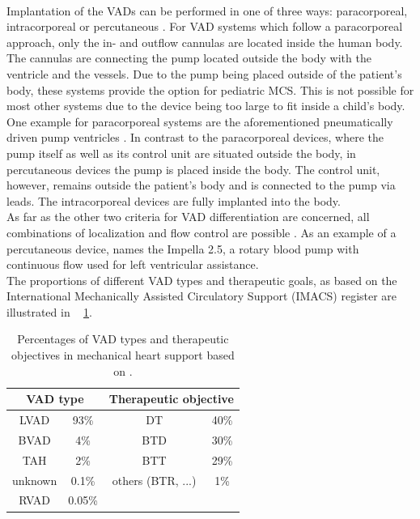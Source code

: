 \\Implantation of the VADs can be performed in one of three ways: paracorporeal, intracorporeal or percutaneous \cite{VAD7}. For VAD systems which follow a paracorporeal approach, only the in- and outflow cannulas are located inside the human body. The cannulas are connecting the pump located outside the body with the ventricle and the vessels. Due to the pump being placed outside of the patient's body, these systems provide the option for pediatric MCS. This is not possible for most other systems due to the device being too large to fit inside a child's body. \cite{VAD10} One example for paracorporeal systems are the aforementioned pneumatically driven pump ventricles \cite{VAD1}. In contrast to the paracorporeal devices, where the pump itself as well as its control unit are situated outside the body, in percutaneous devices the pump is placed inside the body. The control unit, however, remains outside the patient's body and is connected to the pump via leads. The intracorporeal devices are fully implanted into the body. \cite{VAD10}
\\As far as the other two criteria for VAD differentiation are concerned, all combinations of localization and flow control are possible \cite{VAD10}. As an example of a percutaneous device, \cite{VAD7} names the Impella 2.5, a rotary blood pump with continuous flow used for left ventricular assistance.
\\The proportions of different VAD types and therapeutic goals, as based on the International Mechanically Assisted Circulatory Support (IMACS) register are illustrated in \tablename~ \ref{tab:Table2}.
\begin{table}[ht]
  \centering
  \begin{tabular}{cc|cc}
    \toprule
    \multicolumn{2}{c|}{VAD type} &
    \multicolumn{2}{c}{Therapeutic objective} \\
    \midrule
    LVAD & 93\% & DT & 40\%\\
    BVAD & 4\% & BTD & 30\%\\
    TAH & 2\% & BTT & 29\%\\
    unknown & 0.1\% & others (BTR, ...) & 1\%\\
    RVAD & 0.05\% & &\\
    \bottomrule
\end{tabular}
  \caption[Distribution of VAD types and therapeutic objectives]{Percentages of VAD types and therapeutic objectives in mechanical heart support based on \cite{VAD7}.}
  \label{tab:Table2}
\end{table}
